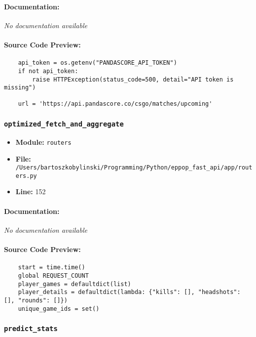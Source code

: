 \documentclass[11pt,a4paper]{article}
\begin{document}
\paragraph{Documentation:} \textit{No documentation available}

\paragraph{Source Code Preview:}
\begin{verbatim}
    api_token = os.getenv("PANDASCORE_API_TOKEN")
    if not api_token:
        raise HTTPException(status_code=500, detail="API token is missing")

    url = 'https://api.pandascore.co/csgo/matches/upcoming'
\end{verbatim}

\vspace{1em}
\subsubsection{\texttt{optimized\_fetch\_and\_aggregate}}

\begin{itemize}
    \item \textbf{Module:} \texttt{routers}
    \item \textbf{File:} \texttt{/Users/bartoszkobylinski/Programming/Python/eppop\_fast\_api/app/routers.py}
    \item \textbf{Line:} 152
\end{itemize}

\paragraph{Documentation:} \textit{No documentation available}

\paragraph{Source Code Preview:}
\begin{verbatim}
    start = time.time()
    global REQUEST_COUNT
    player_games = defaultdict(list)
    player_details = defaultdict(lambda: {"kills": [], "headshots": [], "rounds": []})
    unique_game_ids = set()
\end{verbatim}

\vspace{1em}
\subsubsection{\texttt{predict\_stats}}
\end{document}
